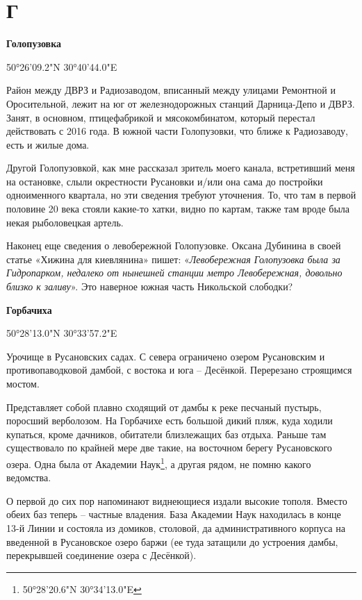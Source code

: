 \chapter*{Г}

\textbf{Голопузовка}

50°26'09.2"N 30°40'44.0"E

Район между ДВРЗ и Радиозаводом, вписанный между улицами Ремонтной и Оросительной, лежит на юг от железнодорожных станций Дарница-Депо и ДВРЗ. Занят, в основном, птицефабрикой и мясокомбинатом, который перестал действовать с 2016 года. В южной части Голопузовки, что ближе к Радиозаводу, есть и жилые дома.

Другой Голопузовкой, как мне рассказал зритель моего канала, встретивший меня на остановке, слыли окрестности Русановки и/или она сама до постройки одноименного квартала, но эти сведения требуют уточнения. То, что там в первой половине 20 века стояли какие-то хатки, видно по картам, также там вроде была некая рыболовецкая артель.

Наконец еще сведения о левобережной Голопузовке. Оксана Дубинина в своей статье «Хижина для киевлянина» пишет: «\textit{Левобережная Голопузовка была за Гидропарком, недалеко от нынешней станции метро Левобережная, довольно близко к заливу}». Это наверное южная часть Никольской слободки?\\

\medskip

\textbf{Горбачиха}

50°28'13.0"N 30°33'57.2"E

Урочище в Русановских садах. С севера ограничено озером Русановским и противопаводковой дамбой, с востока и юга – Десёнкой. Перерезано строящимся мостом.

Представляет собой плавно сходящий от дамбы к реке песчаный пустырь, поросший верболозом. На Горбачихе есть большой дикий пляж, куда ходили  купаться, кроме дачников, обитатели близлежащих баз отдыха. Раньше там существовало по крайней мере две такие, на восточном берегу Русановского озера. Одна была от Академии Наук\footnote{50°28'20.6"N 30°34'13.0"E}, а другая рядом, не помню какого ведомства.

О первой до сих пор напоминают виднеющиеся издали высокие тополя. Вместо обеих баз теперь – частные владения. База Академии Наук находилась в конце 13-й Линии и состояла из домиков, столовой, да административного корпуса на введенной в Русановское озеро баржи (ее туда затащили до устроения дамбы, перекрывшей соединение озера с Десёнкой).

